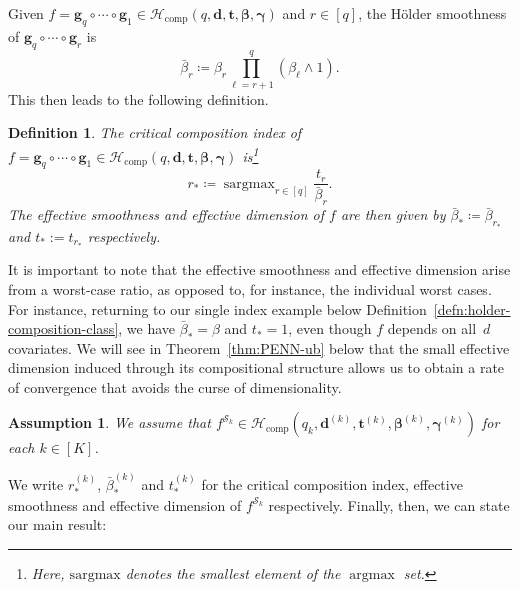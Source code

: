 \documentclass[12pt]{article}
\DeclareMathOperator*{\argmax}{argmax}
\DeclareMathOperator*{\sargmax}{sargmax}
\newtheorem{defn}{Definition}
\newtheorem{assumption}{Assumption}
\begin{document}
Given $f = \bm g_q \circ \cdots \circ \bm g_1 \in \mathcal{H}_{\mathrm{comp}}(q,\bm d, \bm t, \bm\beta, \bm\gamma)$ and $r \in [q]$, the H\"older smoothness of $\bm g_q \circ \cdots \circ \bm g_r$ is
\[
\bar{\beta}_r \coloneqq \beta_r \prod_{\ell=r+1}^{q} (\beta_{\ell} \wedge 1).
\]
This then leads to the following definition.
\begin{defn} \label{defn:effective-smoothness}
The \emph{critical composition index} of $f = \bm g_q \circ \cdots \circ \bm g_1 \in \mathcal{H}_{\mathrm{comp}}(q,\bm d, \bm t, \bm\beta, \bm\gamma)$ is\footnote{Here, $\mathrm{sargmax}$ denotes the smallest element of the $\argmax$ set.}
\[
r_* \coloneqq \sargmax_{r\in [q]} \frac{t_r}{\bar{\beta}_r}.
\]
The \emph{effective smoothness} and \emph{effective dimension} of $f$ are then given by $\bar{\beta}_* \coloneqq \bar{\beta}_{r_*}$ and $t_* := t_{r_*}$ respectively.  
\end{defn}
It is important to note that the effective smoothness and effective dimension arise from a worst-case ratio, as opposed to, for instance, the individual worst cases.  For instance, returning to our single index example below Definition~\ref{defn:holder-composition-class}, we have $\bar{\beta}_* = \beta$ and $t_* = 1$, even though $f$ depends on all~$d$ covariates.  We will see in Theorem~\ref{thm:PENN-ub} below that the small effective dimension induced through its compositional structure allows us to obtain a rate of convergence that avoids the curse of dimensionality.



\begin{assumption} \label{assumption:composition-of-smooth-functions}
    We assume that $f^{\mathcal{S}_k} \in \mathcal{H}_{\mathrm{comp}}(q_k,\bm d^{(k)}, \bm t^{(k)}, \bm \beta^{(k)}, \bm\gamma^{(k)})$ for each $k\in[K]$.
\end{assumption}
We write $r_*^{(k)}$, $\bar{\beta}_*^{(k)}$ and $t_*^{(k)}$ for the critical composition index, effective smoothness and effective dimension of $f^{\mathcal{S}_k}$ respectively.  Finally, then, we can state our main result: 
\end{document}
